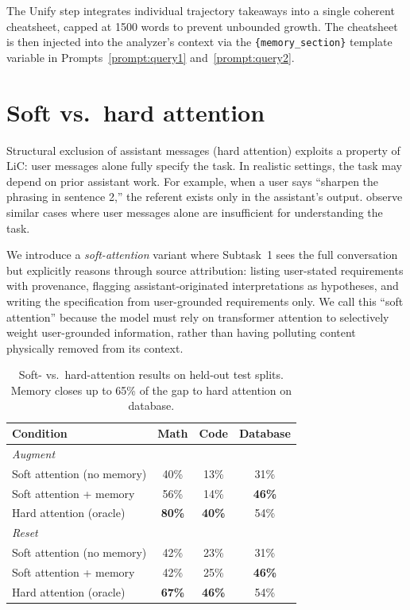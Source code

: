 \documentclass{article}
\begin{document}
The Unify step integrates individual trajectory takeaways into a single coherent cheatsheet, capped at 1500 words to prevent unbounded growth. The cheatsheet is then injected into the analyzer's context via the \texttt{\{memory\_section\}} template variable in Prompts~\ref{prompt:query1} and~\ref{prompt:query2}.


\section{Soft vs.\ hard attention}
\label{app:soft-attention}

Structural exclusion of assistant messages (hard attention) exploits a property of LiC: user messages alone fully specify the task. In realistic settings, the task may depend on prior assistant work. For example, when a user says ``sharpen the phrasing in sentence 2,'' the referent exists only in the assistant's output. \citet{huang2026context} observe similar cases where user messages alone are insufficient for understanding the task.

We introduce a \emph{soft-attention} variant where Subtask~1 sees the full conversation but explicitly reasons through source attribution: listing user-stated requirements with provenance, flagging assistant-originated interpretations as hypotheses, and writing the specification from user-grounded requirements only. We call this ``soft attention'' because the model must rely on transformer attention to selectively weight user-grounded information, rather than having polluting content physically removed from its context.

\begin{table}[h]
\centering
\begin{tabular}{lccc}
\toprule
\textbf{Condition} & \textbf{Math} & \textbf{Code} & \textbf{Database} \\
\midrule
\multicolumn{4}{l}{\emph{Augment}} \\
\quad Soft attention (no memory) & 40\% & 13\% & 31\% \\
\quad Soft attention + memory & 56\% & 14\% & \textbf{46\%} \\
\quad Hard attention (oracle) & \textbf{80\%} & \textbf{40\%} & 54\% \\
\midrule
\multicolumn{4}{l}{\emph{Reset}} \\
\quad Soft attention (no memory) & 42\% & 23\% & 31\% \\
\quad Soft attention + memory & 42\% & 25\% & \textbf{46\%} \\
\quad Hard attention (oracle) & \textbf{67\%} & \textbf{46\%} & 54\% \\
\bottomrule
\end{tabular}
\caption{Soft- vs.\ hard-attention results on held-out test splits. Memory closes up to 65\% of the gap to hard attention on database.}
\label{tab:soft-attention}
\end{table}
\end{document}

